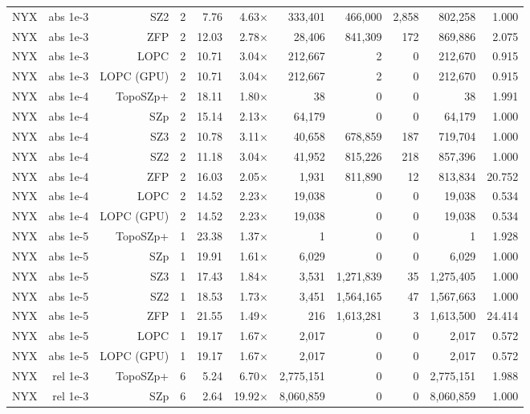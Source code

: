 \begin{tabular}{lrrrrrrrrrr}
NYX & abs 1e-3 & SZ2 & 2 & 7.76 & 4.63$\times$ & 333,401 & 466,000 & 2,858 & 802,258 & 1.000 \\
NYX & abs 1e-3 & ZFP & 2 & 12.03 & 2.78$\times$ & 28,406 & 841,309 & 172 & 869,886 & 2.075 \\
NYX & abs 1e-3 & LOPC & 2 & 10.71 & 3.04$\times$ & 212,667 & 2 & 0 & 212,670 & 0.915 \\
NYX & abs 1e-3 & LOPC (GPU) & 2 & 10.71 & 3.04$\times$ & 212,667 & 2 & 0 & 212,670 & 0.915 \\
NYX & abs 1e-4 & TopoSZp+ & 2 & 18.11 & 1.80$\times$ & 38 & 0 & 0 & 38 & 1.991 \\
NYX & abs 1e-4 & SZp & 2 & 15.14 & 2.13$\times$ & 64,179 & 0 & 0 & 64,179 & 1.000 \\
NYX & abs 1e-4 & SZ3 & 2 & 10.78 & 3.11$\times$ & 40,658 & 678,859 & 187 & 719,704 & 1.000 \\
NYX & abs 1e-4 & SZ2 & 2 & 11.18 & 3.04$\times$ & 41,952 & 815,226 & 218 & 857,396 & 1.000 \\
NYX & abs 1e-4 & ZFP & 2 & 16.03 & 2.05$\times$ & 1,931 & 811,890 & 12 & 813,834 & 20.752 \\
NYX & abs 1e-4 & LOPC & 2 & 14.52 & 2.23$\times$ & 19,038 & 0 & 0 & 19,038 & 0.534 \\
NYX & abs 1e-4 & LOPC (GPU) & 2 & 14.52 & 2.23$\times$ & 19,038 & 0 & 0 & 19,038 & 0.534 \\
NYX & abs 1e-5 & TopoSZp+ & 1 & 23.38 & 1.37$\times$ & 1 & 0 & 0 & 1 & 1.928 \\
NYX & abs 1e-5 & SZp & 1 & 19.91 & 1.61$\times$ & 6,029 & 0 & 0 & 6,029 & 1.000 \\
NYX & abs 1e-5 & SZ3 & 1 & 17.43 & 1.84$\times$ & 3,531 & 1,271,839 & 35 & 1,275,405 & 1.000 \\
NYX & abs 1e-5 & SZ2 & 1 & 18.53 & 1.73$\times$ & 3,451 & 1,564,165 & 47 & 1,567,663 & 1.000 \\
NYX & abs 1e-5 & ZFP & 1 & 21.55 & 1.49$\times$ & 216 & 1,613,281 & 3 & 1,613,500 & 24.414 \\
NYX & abs 1e-5 & LOPC & 1 & 19.17 & 1.67$\times$ & 2,017 & 0 & 0 & 2,017 & 0.572 \\
NYX & abs 1e-5 & LOPC (GPU) & 1 & 19.17 & 1.67$\times$ & 2,017 & 0 & 0 & 2,017 & 0.572 \\
NYX & rel 1e-3 & TopoSZp+ & 6 & 5.24 & 6.70$\times$ & 2,775,151 & 0 & 0 & 2,775,151 & 1.988 \\
NYX & rel 1e-3 & SZp & 6 & 2.64 & 19.92$\times$ & 8,060,859 & 0 & 0 & 8,060,859 & 1.000 \\

\end{tabular}
